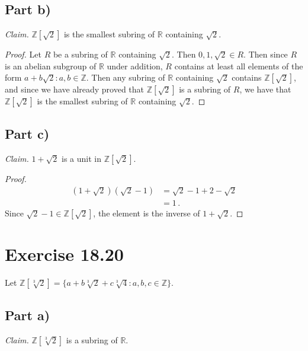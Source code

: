 \documentclass{abrice}
\newcommand{\Z}{\mathbb{Z}}
\newcommand{\R}{\mathbb{R}}
\begin{document}
\subsection{Part b)}

\emph{Claim.} $\Z[\sqrt 2]$ is the smallest subring of $\R$ containing $\sqrt
2$.

\begin{proof}
  Let $R$ be a subring of $\R$ containing $\sqrt 2$. Then $0,1,\sqrt 2 \in R$.
  Then since $R$ is an abelian subgroup of $\R$ under addition, $R$ contains at
  least all elements of the form $a + b\sqrt2 : a,b \in \Z$. Then any subring of
  $\R$ containing $\sqrt 2$ contains $\Z[\sqrt 2]$, and since we have already
  proved that $\Z[\sqrt 2]$ is a subring of $R$, we have that $\Z[\sqrt 2]$ is
  the smallest subring of $\R$ containing $\sqrt 2$.
\end{proof}

\subsection{Part c)}

\emph{Claim.} $1 + \sqrt 2$ is a unit in $\Z[\sqrt 2]$.

\begin{proof}
  \begin{align*}
    (1 + \sqrt 2)(\sqrt 2 - 1)
    &= \sqrt 2 - 1 + 2 - \sqrt 2 \\
    &= 1\, .
  \end{align*}
  Since $\sqrt 2 - 1 \in \Z[\sqrt 2]$, the element is the inverse of $1 + \sqrt 2$.
\end{proof}

\section{Exercise 18.20}

Let $\Z[\sqrt[3]{2}] = \{ a + b \sqrt[3]{2} + c \sqrt[3]{4} : a,b,c \in \Z \}$.

\subsection{Part a)}

\emph{Claim.} $\Z[\sqrt[3]{2}]$ is a subring of $\R$.
\end{document}
